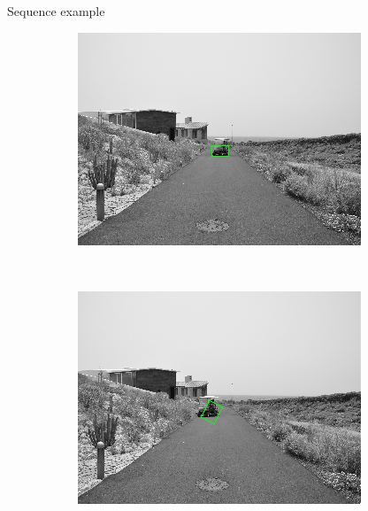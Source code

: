 \begin{frame}{Sequence example}
\begin{figure}[h!]
\begin{subfigure}[b]{0.24\columnwidth}
	  \includegraphics[width=\textwidth]{sequence/seq3}\label{fig:seq3}
      \end{subfigure}%
      ~
      \begin{subfigure}[b]{0.24\columnwidth}
	  \includegraphics[width=\textwidth]{sequence/seq4}\label{fig:seq4}
      \end{subfigure}%
      \\
      \begin{subfigure}[b]{0.24\columnwidth}

\end{subfigure}
\end{figure}
\end{frame}
